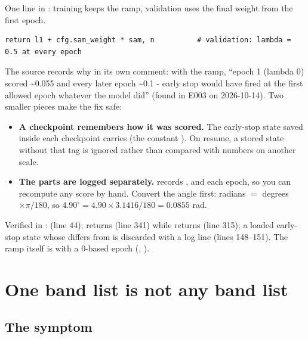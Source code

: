 One line in : training keeps the ramp, validation uses the final weight from the
first epoch.
\begin{lstlisting}
return l1 + cfg.sam_weight * sam, n          # validation: lambda = 0.5 at every epoch
\end{lstlisting}
The source records why in its own comment: with the ramp, ``epoch 1 (lambda 0) scored \textasciitilde 0.055 and every
later epoch \textasciitilde 0.1 - early stop would have fired at the first allowed epoch whatever the model did''
(found in E003 on 2026-10-14). Two smaller pieces make the fix safe:
\begin{itemize}
  \item \textbf{A checkpoint remembers how it was scored.} The early-stop state saved inside each checkpoint carries
     (the constant ). On resume, a stored state without that tag is
    ignored rather than compared with numbers on another scale.
  \item \textbf{The parts are logged separately.}  records ,  and
     each epoch, so you can recompute any score by hand. Convert the angle first:
    radians $=$ degrees $\times \pi / 180$, so $4.90^\circ = 4.90 \times 3.1416 / 180 = 0.0855$ rad.
\end{itemize}

\begin{sourcenote}
Verified in : 
(line 44);  returns  (line 341) while
 returns  (line 315); a loaded
early-stop state whose  differs from  is discarded with a log line (lines 148--151). The
ramp itself is  with a 0-based epoch
(, ).
\end{sourcenote}

\section{One band list is not any band list}\label{sec:pretrain:density}

\subsection{The symptom}

